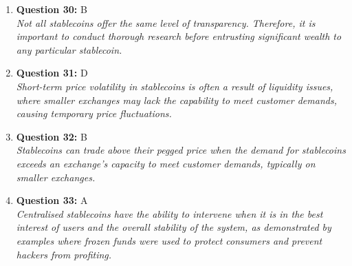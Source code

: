 \documentclass[12pt,a4paper]{article}
\begin{document}
\begin{enumerate}
\item \textbf{Question 30:} B
\\ \textit{Not all stablecoins offer the same level of transparency. 
Therefore, it is important to conduct thorough research 
before entrusting significant wealth to any particular stablecoin.}

\item \textbf{Question 31:} D
\\ \textit{Short-term price volatility in stablecoins is often a result 
of liquidity issues, where smaller exchanges may lack the capability 
to meet customer demands, causing temporary price fluctuations.}

\item \textbf{Question 32:} B
\\ \textit{Stablecoins can trade above their pegged price when the 
demand for stablecoins exceeds an exchange's capacity to 
meet customer demands, typically on smaller exchanges.}

\item \textbf{Question 33:} A
\\ \textit{Centralised stablecoins have the ability to intervene 
when it is in the best interest of users and the overall stability 
of the system, as demonstrated by examples where frozen funds were 
used to protect consumers and prevent hackers from profiting.}


\end{enumerate}
\end{document}
